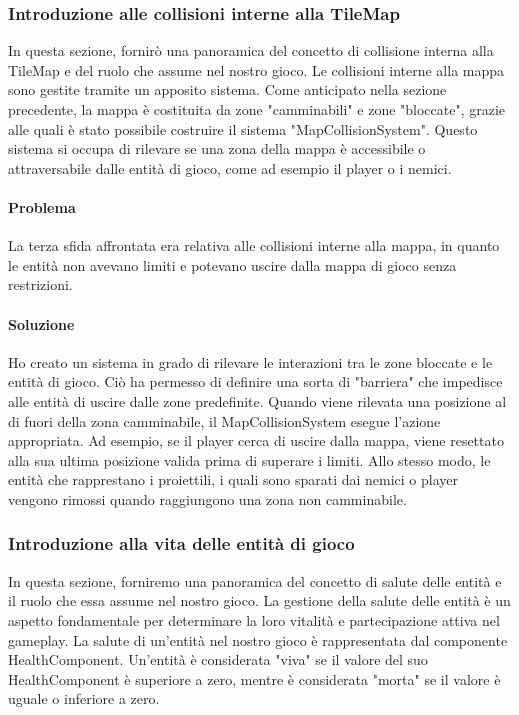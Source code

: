 \documentclass[a4paper,12pt]{report}
\begin{document}
\subsubsection*{Introduzione alle collisioni interne alla TileMap}
In questa sezione, fornirò una panoramica del concetto di collisione interna alla TileMap e del ruolo che assume nel nostro gioco.
Le collisioni interne alla mappa sono gestite tramite un apposito sistema.
Come anticipato nella sezione precedente, la mappa è costituita da zone "camminabili" e zone "bloccate", grazie alle quali è stato possibile costruire il sistema "MapCollisionSystem".
Questo sistema si occupa di rilevare se una zona della mappa è accessibile o attraversabile dalle entità di gioco, come ad esempio il player o i nemici.
\paragraph*{Problema}
La terza sfida affrontata era relativa alle collisioni interne alla mappa, in quanto le entità non avevano limiti e potevano uscire dalla mappa di gioco senza restrizioni.
\paragraph*{Soluzione}
Ho creato un sistema in grado di rilevare le interazioni tra le zone bloccate e le entità di gioco.
Ciò ha permesso di definire una sorta di "barriera" che impedisce alle entità di uscire dalle zone predefinite.
Quando viene rilevata una posizione al di fuori della zona camminabile, il MapCollisionSystem esegue l'azione appropriata.
Ad esempio, se il player cerca di uscire dalla mappa, viene resettato alla sua ultima posizione valida prima di superare i limiti.
Allo stesso modo, le entità che rapprestano i proiettili, i quali sono sparati dai nemici o player vengono rimossi quando raggiungono una zona non camminabile.
\subsubsection*{Introduzione alla vita delle entità di gioco}
In questa sezione, forniremo una panoramica del concetto di salute delle entità e il ruolo che essa assume nel nostro gioco. 
La gestione della salute delle entità è un aspetto fondamentale per determinare la loro vitalità e partecipazione attiva nel gameplay.
La salute di un'entità nel nostro gioco è rappresentata dal componente HealthComponent. 
Un'entità è considerata "viva" se il valore del suo HealthComponent è superiore a zero, mentre è considerata "morta" se il valore è uguale o inferiore a zero.
\end{document}
